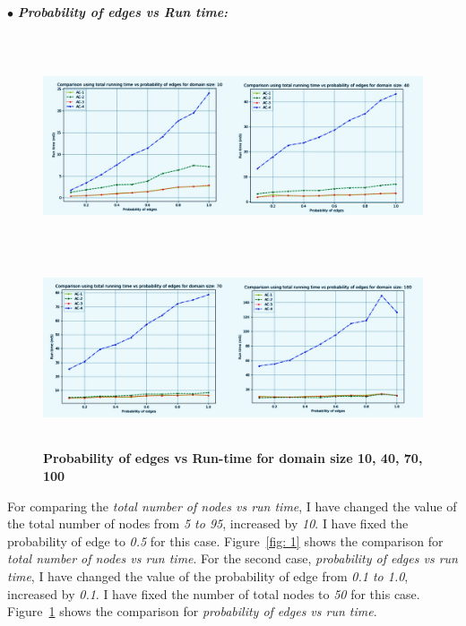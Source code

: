 \documentclass[12pt, english]{article}
\begin{document}
\hspace*{0.5cm}$\bullet$ \textit{\textbf{Probability of edges vs Run time:}}
\begin{figure}[ht]
		{\includegraphics[width=\textwidth,height=2.6in]{3.jpeg}}
		{\includegraphics[width=\textwidth,height=2in]{4.jpeg}}
		\caption{\textbf{Probability of edges vs Run-time for domain size 10, 40, 70, 100}}
        \label{fig: 2}
\end{figure}

\par
For comparing the \textit{total number of nodes vs run time}, I have changed the value of the total number of nodes from \textit{5 to 95}, increased by \textit{10}. I have fixed the probability of edge to \textit{0.5} for this case. Figure~\ref{fig: 1} shows the comparison for \textit{total number of nodes vs run time}. For the second case, \textit{probability of edges vs run time}, I have changed the value of the probability of edge from \textit{0.1 to 1.0}, increased by \textit{0.1}. I have fixed the number of total nodes to \textit{50} for this case. Figure~\ref{fig: 2} shows the comparison for \textit{probability of edges vs run time}.
\end{document}
